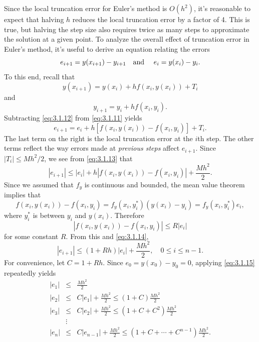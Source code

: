 Since the local truncation error for Euler's method is $O(h^{2})$, it's reasonable to expect that
halving $h$ reduces the local truncation error by a factor of 4. This is true, but halving the step
size also requires twice as many steps to approximate the solution at a given point. To analyze the
overall effect of truncation error in Euler's method, it's useful to derive an equation relating the
errors
\[
  e_{i+1}=y(x_{i+1})-y_{i+1}\mbox{\quad and \quad}e_{i}=y(x_{i})-y_{i}.
\]
To this end, recall that
\begin{equation}
  \label{eq:3.1.11}y(x_{i+1})=y(x_{i})+hf(x_{i},y(x_{i}))+T_{i}
\end{equation}
and
\begin{equation}
  \label{eq:3.1.12}y_{i+1}=y_{i}+hf(x_{i},y_{i}).
\end{equation}
Subtracting \eqref{eq:3.1.12} from \eqref{eq:3.1.11} yields
\begin{equation}
  \label{eq:3.1.13}e_{i+1}=e_{i}+h\left[f(x_{i},y(x_{i}))-f(x_{i},y_{i})\right]+T_{i}.
\end{equation}
The last term on the right is the local truncation error at the $i$th step. The other terms reflect
the way errors made at {\color{blue}\it previous steps\/} affect $e_{i+1}$. Since
$|T_{i}|\le Mh^{2}/2$, we see from \eqref{eq:3.1.13} that
\begin{equation}
  \label{eq:3.1.14}|e_{i+1}|\le|e_{i}|+h|f(x_{i},y(x_{i}))-f(x_{i},y_{i})|+\frac{Mh^{2}}{2}.
\end{equation}
Since we assumed that $f_{y}$ is continuous and bounded, the mean value theorem implies that
\[
  f(x_{i},y(x_{i}))-f(x_{i},y_{i})=f_{y}(x_{i},y_{i}^{*})(y(x_{i})-y_{i})=f_{y}(x_{i},y_{i}^{*})e_{i},
\]
where $y_{i}^{*}$ is between $y_{i}$ and $y(x_{i})$. Therefore
\[
  |f(x_{i},y(x_{i}))-f(x_{i},y_{i})|\le R|e_{i}|
\]
for some constant $R$. From this and \eqref{eq:3.1.14},
\begin{equation}
  \label{eq:3.1.15}|e_{i+1}|\le(1+Rh)|e_{i}|+\frac{Mh^{2}}{2},\quad0\le i\le n-1.
\end{equation}
For convenience, let $C=1+Rh$. Since $e_{0}=y(x_{0})-y_{0}=0$, applying \eqref{eq:3.1.15} repeatedly
yields
\begin{eqnarray}
  |e_{1}| & \le    & \frac{Mh^{2}}{2}\nonumber                                        \\
  |e_{2}| & \le    & C|e_{1}|+\frac{Mh^{2}}{2}\le(1+C)\frac{Mh^{2}}{2}\nonumber       \\
  |e_{3}| & \le    & C|e_{2}|+\frac{Mh^{2}}{2}\le(1+C+C^{2})\frac{Mh^{2}}{2}\nonumber \\
          & \vdots & \nonumber                                                        \\
  |e_{n}| & \le    & C|e_{n-1}|+\frac{Mh^{2}}{2}\le(1+C+\cdots+C^{n-1})\frac{Mh^{2}}{2}.\label{eq:3.1.16}
\end{eqnarray}

